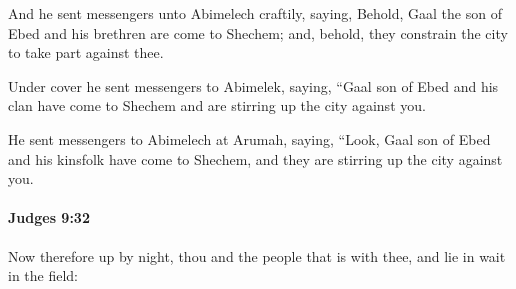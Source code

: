 			\begin{versebox}
					\item[BHS] 
					\item[ASV] And he sent messengers unto Abimelech craftily, saying, Behold, Gaal the son of Ebed and his brethren are come to Shechem; and, behold, they constrain the city to take part against thee.
					\item[NIV] Under cover he sent messengers to Abimelek, saying, “Gaal son of Ebed and his clan have come to Shechem and are stirring up the city against you.
					\item[NRSV] He sent messengers to Abimelech at Arumah, saying, “Look, Gaal son of Ebed and his kinsfolk have come to Shechem, and they are stirring up the city against you.
			\end{versebox}

		\paragraph{Judges 9:32} %
			\label{JUDGES-9-32}

			Now therefore up by night, thou and the people that is with thee, and lie in wait in the field:

